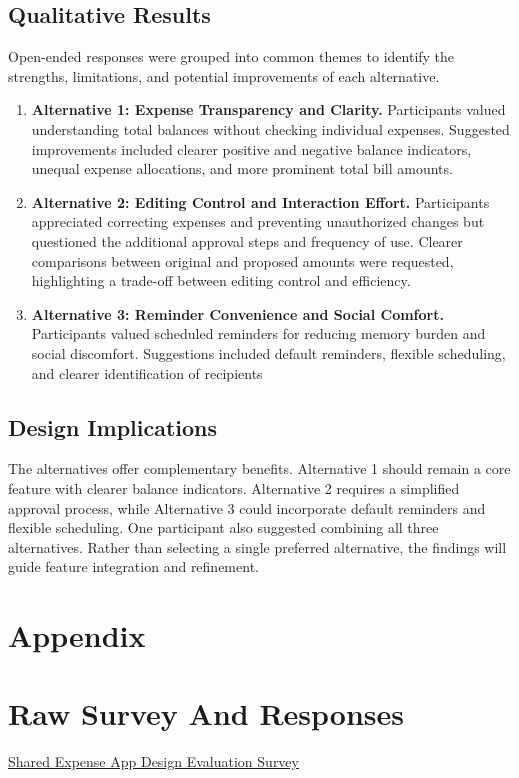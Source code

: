 \documentclass[letterpaper]{jdf}
\begin{document}
\subsection{Qualitative Results}
Open-ended responses were grouped into common themes to identify the strengths, limitations, and potential improvements of each alternative.
\begin{enumerate}[label=\arabic*)]
\item \textbf{Alternative 1: Expense Transparency and Clarity.}
 Participants valued understanding total balances without checking individual expenses. Suggested improvements included clearer positive and negative balance indicators, unequal expense allocations, and more prominent total bill amounts.
\item \textbf{Alternative 2: Editing Control and Interaction Effort.}
Participants appreciated correcting expenses and preventing unauthorized changes but questioned the additional approval steps and frequency of use. Clearer comparisons between original and proposed amounts were requested, highlighting a trade-off between editing control and efficiency.
\item \textbf{Alternative 3: Reminder Convenience and Social Comfort.}
Participants valued scheduled reminders for reducing memory burden and social discomfort. Suggestions included default reminders, flexible scheduling, and clearer identification of recipients
\end{enumerate}
\subsection{Design Implications}
The alternatives offer complementary benefits. Alternative 1 should remain a core feature with clearer balance indicators. Alternative 2 requires a simplified approval process, while Alternative 3 could incorporate default reminders and flexible scheduling.
One participant also suggested combining all three alternatives. Rather than selecting a single preferred alternative, the findings will guide feature integration and refinement.


\clearpage
\section{Appendix}\label{appendix}
\appendix

\section{Raw Survey And Responses}
\href{https://github.com/ZihanZheng2000/Group-Project/blob/main/Shared%20Expense%20App%20Design%20Evaluation%20Survey.xlsx}{Shared Expense App Design Evaluation Survey}
\end{document}
